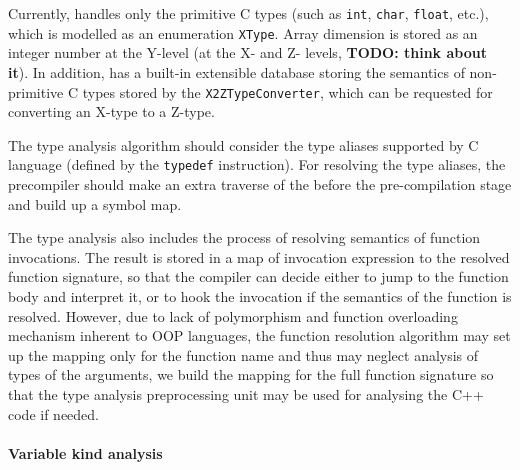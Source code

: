 Currently, \porthos[2] handles only the primitive C types (such as \texttt{int}, \texttt{char}, \texttt{float}, etc.), which is modelled as an enumeration \texttt{XType}. %
Array dimension is stored as an integer number at the Y-level (at the X- and Z- levels, \textbf{TODO: think about it}). %
In addition, \porthos[2] has a built-in extensible database storing the semantics of non-primitive C types stored by the \texttt{X2ZTypeConverter}, %
which can be requested for converting an X-type to a Z-type. %


The type analysis algorithm should consider the type aliases supported by C language (defined by the \texttt{typedef} instruction).
For resolving the type aliases, the precompiler should make an extra traverse of the \ytree{} before the pre-compilation stage and build up a symbol map.

The type analysis also includes the process of resolving semantics of function invocations.
The result is stored in a map of invocation expression to the resolved function signature, so that the compiler can decide either to jump to the function body and interpret it, or to hook the invocation if the semantics of the function is resolved.
However, due to lack of polymorphism and function overloading mechanism inherent to OOP languages, the function resolution algorithm may set up the mapping only for the function name and thus may neglect analysis of types of the arguments, we build the mapping for the full function signature so that the type analysis preprocessing unit may be used for analysing the C++ code if needed.



\paragraph{Variable kind analysis}
\label{ch:impl:proc:x-pre-compiler:var}

